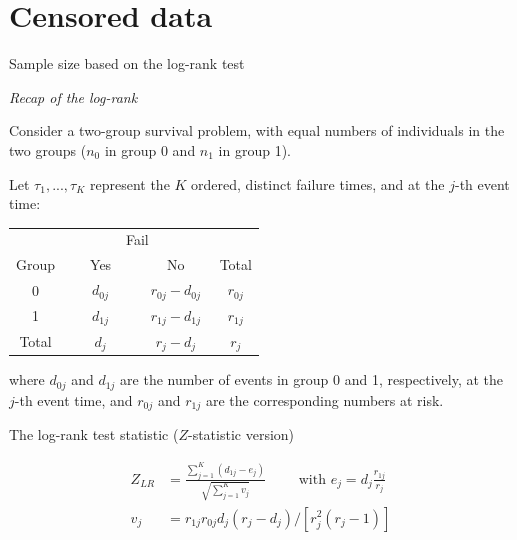 \documentclass[ignorenonframetext,]{beamer}
\begin{document}
\hypertarget{censored-data}{%
\section{Censored data}\label{censored-data}}

\begin{frame}{%
\protect\hypertarget{sample-size-based-on-the-log-rank-test}{%
Sample size based on the log-rank test}}

\emph{Recap of the log-rank}

Consider a two-group survival problem, with equal numbers of individuals
in the two groups (\(n_0\) in group 0 and \(n_1\) in group 1).

Let \(\tau_1,...,\tau_K\) represent the \(K\) ordered, distinct failure
times, and at the \(j\)-th event time:

\begin{center}
\begin{tabular}{cccc}
\hline
& \multicolumn{2}{c}{Fail} & \\ \cline{2-3}
\multicolumn{1}{c}{Group } & ~~~Yes~~~ & ~~~No~~~ & Total\\  \hline
0 & $d_{0j}$ & $r_{0j} - d_{0j}$ & $r_{0j}$ \\[1ex]
1 & $d_{1j}$ & $r_{1j} - d_{1j}$ & $r_{1j}$ \\[1ex]
\hline
Total &  $d_j  $ & $r_j   - d_j  $ & $r_j  $  \\ 
 \hline
\end{tabular}
\end{center}

where \(d_{0j}\) and \(d_{1j}\) are the number of events in group 0 and
1, respectively, at the \(j\)-th event time, and \(r_{0j}\) and
\(r_{1j}\) are the corresponding numbers at risk.

\end{frame}

\begin{frame}{%
\protect\hypertarget{the-log-rank-test-statistic-z-statistic-version}{%
The log-rank test statistic (\(Z\)-statistic version)}}

\begin{align*}
Z_{LR} &=   \frac{\sum_{j=1}^{K} (d_{1j} - e_j)}{ 
 \sqrt{\sum_{j=1}^{K} v_j}} \qquad \text{ with } e_j = d_j \frac{r_{1j}}{r_j} \\[1ex]
v_j &= r_{1j} r_{0j} d_j(r_j-d_j)/[r_j^2(r_j-1)]
\end{align*}

\end{frame}
\end{document}
